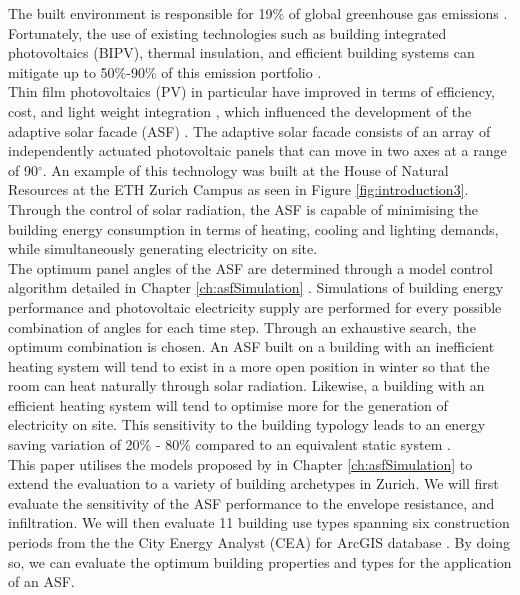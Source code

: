 
The built environment is responsible for 19\% of global greenhouse gas emissions \cite{IPCC}. Fortunately, the use of existing technologies such as building integrated photovoltaics (BIPV), thermal insulation, and efficient building systems can mitigate up to 50\%-90\% of this emission portfolio \cite{IPCC}.\\

Thin film photovoltaics (PV) in particular have improved in terms of efficiency, cost, and light weight integration \cite{NREL, kushiya2014cis, kaelin2004low, jelle2012building}, which influenced the development of the adaptive solar facade (ASF) \cite{nagy2016adaptive}. The adaptive solar facade consists of an array of independently actuated photovoltaic panels that can move in two axes at a range of 90$^{\circ}$. An example of this technology was built at the House of Natural Resources at the ETH Zurich Campus as seen in Figure \ref{fig:introduction3}. Through the control of solar radiation, the ASF is capable of minimising the building energy consumption in terms of heating, cooling and lighting demands, while simultaneously generating electricity on site.\\

The optimum panel angles of the ASF are determined through a model control algorithm detailed in Chapter  \ref{ch:asfSimulation} \cite{jayathissa2017AE}. Simulations of building energy performance and photovoltaic electricity supply are performed for every possible combination of angles for each time step. Through an exhaustive search, the optimum combination is chosen. An ASF built on a  building with an inefficient heating system will tend to exist in a more open position in winter so that the room can heat naturally through solar radiation. Likewise, a building with an efficient heating system will tend to optimise more for the generation of electricity on site. This sensitivity to the building typology leads to an energy saving variation of 20\% - 80\% compared to an equivalent static system \cite{jayathissa2017AE, jayathissa2016PVSEC}. \\

This paper utilises the models proposed by in Chapter  \ref{ch:asfSimulation} to extend the evaluation to a variety of building archetypes in Zurich. We will first evaluate the sensitivity of the ASF performance to the envelope resistance, and infiltration. We will then evaluate 11 building use types spanning six construction periods from the the City Energy Analyst (CEA) for ArcGIS database \cite{fonseca2016city}. By doing so, we can evaluate the optimum building properties and types for the application of an ASF. \\



